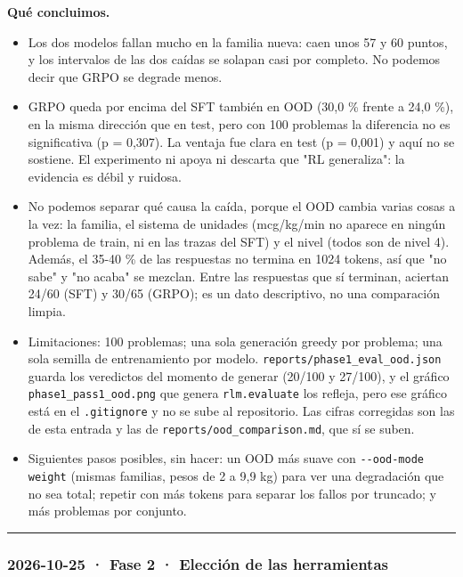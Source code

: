 \textbf{Qué concluimos.}

\begin{itemize}
\tightlist
\item
  Los dos modelos fallan mucho en la familia nueva: caen unos 57 y 60 puntos, y los intervalos
  de las dos caídas se solapan casi por completo. No podemos decir que GRPO se degrade menos.
\item
  GRPO queda por encima del SFT también en OOD (30,0 \% frente a 24,0 \%), en la misma dirección
  que en test, pero con 100 problemas la diferencia no es significativa (p = 0,307). La ventaja
  fue clara en test (p = 0,001) y aquí no se sostiene. El experimento ni apoya ni descarta que
  "RL generaliza": la evidencia es débil y ruidosa.
\item
  No podemos separar qué causa la caída, porque el OOD cambia varias cosas a la vez: la familia,
  el sistema de unidades (mcg/kg/min no aparece en ningún problema de train, ni en las trazas
  del SFT) y el nivel (todos son de nivel 4). Además, el 35-40 \% de las respuestas no termina
  en 1024 tokens, así que "no sabe" y "no acaba" se mezclan. Entre las respuestas que sí
  terminan, aciertan 24/60 (SFT) y 30/65 (GRPO); es un dato descriptivo, no una comparación
  limpia.
\item
  Limitaciones: 100 problemas; una sola generación greedy por problema; una sola semilla de
  entrenamiento por modelo. \texttt{reports/\allowbreak{}phase1\_\allowbreak{}eval\_\allowbreak{}ood.json} guarda los veredictos del momento
  de generar (20/100 y 27/100), y el gráfico \texttt{phase1\_\allowbreak{}pass1\_\allowbreak{}ood.png} que genera \texttt{rlm.evaluate}
  los refleja, pero ese gráfico está en el \texttt{.gitignore} y no se sube al repositorio. Las cifras
  corregidas son las de esta entrada y las de \texttt{reports/\allowbreak{}ood\_\allowbreak{}comparison.md}, que sí se suben.
\item
  Siguientes pasos posibles, sin hacer: un OOD más suave con \texttt{-\/\allowbreak{}-ood-mode weight} (mismas
  familias, pesos de 2 a 9,9 kg) para ver una degradación que no sea total; repetir con más
  tokens para separar los fallos por truncado; y más problemas por conjunto.
\end{itemize}

\begin{center}\rule{0.5\linewidth}{0.5pt}\end{center}

\subsubsection{2026-10-25 · Fase 2 · Elección de las herramientas}

